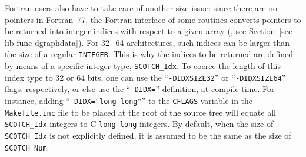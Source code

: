 Fortran users also have to take care of another size issue: since
there are no pointers in Fortran~77, the Fortran interface of some
routines converts pointers to be returned into integer indices with
respect to a given array (\eg, see
Section~\ref{sec-lib-func-dgraphdata}).
For 32\_64 architectures, such indices can be larger than the size of
a regular {\tt INTEGER}. This is why the indices to be returned are
defined by means of a specific integer type, {\tt SCOTCH\_Idx}. To
coerce the length of this index type to 32 or 64 bits, one can use the
``{\tt -DIDXSIZE32}'' or ``{\tt -DIDXSIZE64}'' flags, respectively, or
else use the ``{\tt -DIDX=}'' definition, at compile time. For
instance, adding ``{\tt -DIDX="long~long"}'' to the {\tt CFLAGS}
variable in the {\tt Makefile.inc} file to be placed at the root of
the source tree will equate all {\tt SCOTCH\_\lbt Idx} integers to C
{\tt long long} integers. By default, when the size of
{\tt SCOTCH\_\lbt Idx} is not explicitly defined, it is assumed to be
the same as the size of {\tt SCOTCH\_\lbt Num}.
